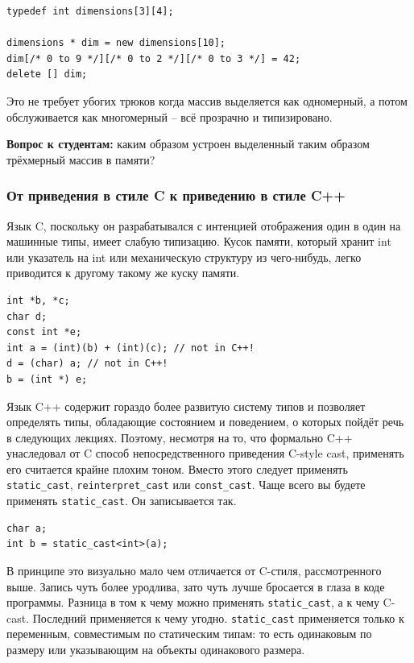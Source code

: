 \documentclass[a4paper,12pt,oneside]{article}
\newif\ifanswers
\begin{document}
\begin{lstlisting}
typedef int dimensions[3][4];

dimensions * dim = new dimensions[10];
dim[/* 0 to 9 */][/* 0 to 2 */][/* 0 to 3 */] = 42;
delete [] dim;
\end{lstlisting}

Это не требует убогих трюков когда массив выделяется как одномерный, а потом обслуживается как многомерный -- всё прозрачно и типизировано.

\textbf{Вопрос к студентам:} каким образом устроен выделенный таким образом трёхмерный массив в памяти?

\ifanswers
Правильный ответ: это jagged-вектор из одномерных массивов с двумерным доступом к каждому
\fi

\subsubsection{От приведения в стиле C к приведению в стиле C++}\label{FromCCastToCPP}

Язык C, поскольку он разрабатывался с интенцией отображения один в один на машинные типы, имеет слабую типизацию. Кусок памяти, который хранит int или указатель на int или механическую структуру из чего-нибудь, легко приводится к другому такому же куску памяти.

\begin{lstlisting}
int *b, *c;
char d;
const int *e;
int a = (int)(b) + (int)(c); // not in C++! 
d = (char) a; // not in C++! 
b = (int *) e;
\end{lstlisting}

Язык C++ содержит гораздо более развитую систему типов и позволяет определять типы, обладающие состоянием и поведением, о которых пойдёт речь в следующих лекциях. Поэтому, несмотря на то, что формально C++ унаследовал от C способ непосредственного приведения C-style cast, применять его считается крайне плохим тоном. Вместо этого следует применять \lstinline!static_cast!, \lstinline!reinterpret_cast! или \lstinline!const_cast!. Чаще всего вы будете применять \lstinline!static_cast!. Он записывается так.

\begin{lstlisting}
char a;
int b = static_cast<int>(a);
\end{lstlisting}

В принципе это визуально мало чем отличается от C-стиля, рассмотренного выше. Запись чуть более уродлива, зато чуть лучше бросается в глаза в коде программы. Разница в том к чему можно применять \lstinline!static_cast!, а к чему C-cast. Последний применяется к чему угодно. \lstinline!static_cast! применяется только к переменным, совместимым по статическим типам: то есть одинаковым по размеру или указывающим на объекты одинакового размера.
\end{document}
